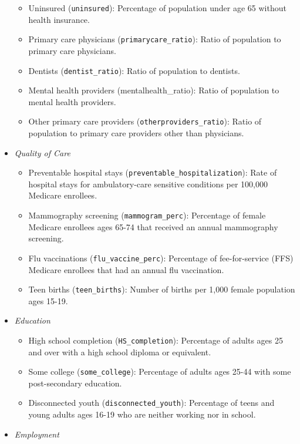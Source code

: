 \documentclass[
]{article}
\providecommand{\tightlist}{%
  \setlength{\itemsep}{0pt}\setlength{\parskip}{0pt}}
\begin{document}
\begin{itemize}
  \begin{itemize}
  \tightlist
  \item
    Uninsured (\texttt{uninsured}): Percentage of population under age 65 without health insurance.
  \item
    Primary care physicians (\texttt{primarycare\_ratio}): Ratio of population to primary care physicians.
  \item
    Dentists (\texttt{dentist\_ratio}): Ratio of population to dentists.
  \item
    Mental health providers (mentalhealth\_ratio): Ratio of population to mental health providers.
  \item
    Other primary care providers (\texttt{otherproviders\_ratio}): Ratio of population to primary care providers other than physicians.
  \end{itemize}
\item
  \emph{Quality of Care}

  \begin{itemize}
  \tightlist
  \item
    Preventable hospital stays (\texttt{preventable\_hospitalization}): Rate of hospital stays for ambulatory-care sensitive conditions per 100,000 Medicare enrollees.
  \item
    Mammography screening (\texttt{mammogram\_perc}): Percentage of female Medicare enrollees ages 65-74 that received an annual mammography screening.
  \item
    Flu vaccinations (\texttt{flu\_vaccine\_perc}): Percentage of fee-for-service (FFS) Medicare enrollees that had an annual flu vaccination.
  \item
    Teen births (\texttt{teen\_births}): Number of births per 1,000 female population ages 15-19.
  \end{itemize}
\item
  \emph{Education}

  \begin{itemize}
  \tightlist
  \item
    High school completion (\texttt{HS\_completion}): Percentage of adults ages 25 and over with a high school diploma or equivalent.
  \item
    Some college (\texttt{some\_college}): Percentage of adults ages 25-44 with some post-secondary education.
  \item
    Disconnected youth (\texttt{disconnected\_youth}): Percentage of teens and young adults ages 16-19 who are neither working nor in school.
  \end{itemize}
\item
  \emph{Employment}


\end{itemize}
\end{document}
